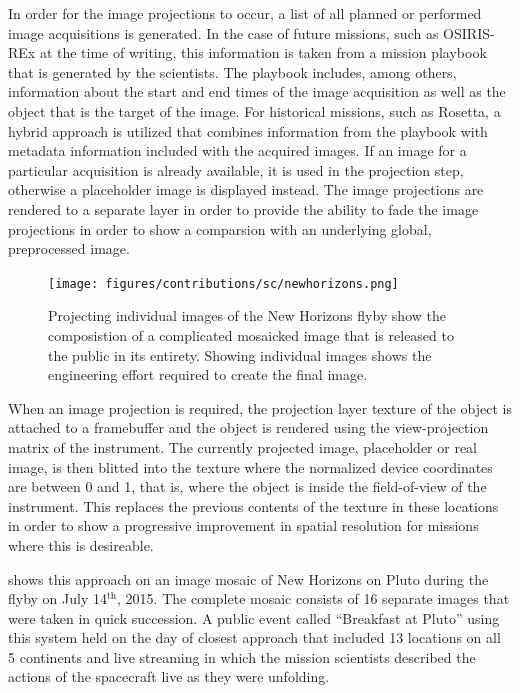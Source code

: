 In order for the image projections to occur, a list of all planned or performed image acquisitions is generated.  In the case of future missions, such as OSIRIS-REx at the time of writing, this information is taken from a mission playbook that is generated by the scientists.  The playbook includes, among others, information about the start and end times of the image acquisition as well as the object that is the target of the image.  For historical missions, such as Rosetta, a hybrid approach is utilized that combines information from the playbook with metadata information included with the acquired images.  If an image for a particular acquisition is already available, it is used in the projection step, otherwise a placeholder image is displayed instead.  The image projections are rendered to a separate layer in order to provide the ability to fade the image projections in order to show a comparsion with an underlying global, preprocessed image.

\begin{figure}
\centering
\texttt{[image: figures/contributions/sc/newhorizons.png]}
\caption{Projecting individual images of the New Horizons flyby show the composistion of a complicated mosaicked image that is released to the public in its entirety.  Showing individual images shows the engineering effort required to create the final image.}
\label{contributions:astro:sc:newhorizons}
\end{figure}

When an image projection is required, the projection layer texture of the object is attached to a framebuffer and the object is rendered using the view-projection matrix of the instrument.  The currently projected image, placeholder or real image, is then blitted into the texture where the normalized device coordinates are between 0 and 1, that is, where the object is inside the field-of-view of the instrument.  This replaces the previous contents of the texture in these locations in order to show a progressive improvement in spatial resolution for missions where this is desireable.

 shows this approach on an image mosaic of New Horizons on Pluto during the flyby on July 14$^{\textrm{th}}$, 2015.  The complete mosaic consists of 16 separate images that were taken in quick succession.  A public event called ``Breakfast at Pluto'' using this system held on the day of closest approach that included 13 locations on all 5 continents and live streaming in which the mission scientists described the actions of the spacecraft live as they were unfolding.

